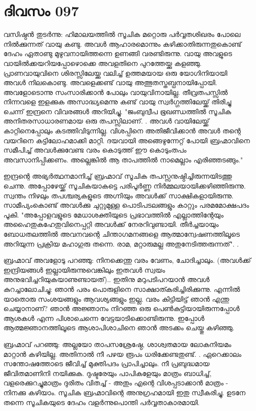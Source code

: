 \newpage
\section{ദിവസം 097}


വസിഷ്ഠന്‍ തുടര്‍ന്നു: ഹിമാലയത്തില്‍ സൂചിക മറ്റൊരു പര്‍വ്വതശിഖരം പോലെ നില്‍ക്കുന്നത്‌ വായു കണ്ടു. അവള്‍ ആഹാരമൊന്നും കഴിക്കാതിരുന്നതുകൊണ്ട്‌ ദേഹം ഏതാണ്ടു മുഴുവനായിത്തന്നെ ഉണങ്ങി വരണ്ടിരുന്നു. വായു അവളുടെ വായില്‍ക്കയറിയപ്പോഴൊക്കെ അവളതിനെ പുറത്തേയ്ക്കു കളഞ്ഞു. പ്രാണവായുവിനെ ശിരസ്സിലേയ്ക്കു വലിച്ച്‌ ഉത്തമയായ ഒരു യോഗിനിയായി അവള്‍ നിലകൊണ്ടു. അവളെക്കണ്ട്‌ വായു അത്ഭുതസ്തബ്ധനായിപ്പോയി. അവളോടൊന്നു സംസാരിക്കാന്‍ പോലും വായുവിനായില്ല. തീവ്രതപസ്സില്‍ നിന്നവളെ ഇളക്കുക അസാദ്ധ്യമെന്നു കണ്ട്‌ വായു സ്വര്‍ഗ്ഗത്തിലേയ്ക്ക്‌ തിരിച്ചു ചെന്ന് ഇന്ദ്രനെ വിവരങ്ങള്‍ അറിയിച്ചു. "ജംബുദ്വീപ ഭൂഖണ്ഡത്തില്‍ സൂചിക അനിതരസാധാരണമായ ഒരു തപസ്സിലാണ്‌. . അവള്‍ വായിലേയ്ക്ക്‌ കാറ്റിനെപ്പോലും കടത്തിവിടുന്നില്ല. വിശപ്പിനെ അതിജീവിക്കാന്‍ അവള്‍ തന്റെ വയറിനെ കട്ടിലോഹമാക്കി മാറ്റി. ദയവായി അങ്ങെഴുന്നേറ്റ്‌ പോയി ബ്രഹ്മാവിനെ സമീപിച്ച്‌ അവള്‍ക്കുവേണ്ട വരം കൊടുത്ത്‌ ഈ കൊടുംതപം അവസാനിപ്പിക്കണം. അല്ലെങ്കില്‍ ആ താപത്തില്‍ നാമെല്ലാം എരിഞ്ഞടങ്ങും." 

ഇന്ദ്രന്റെ അഭ്യര്‍ത്ഥനമാനിച്ച്‌ ബ്രഹ്മാവ്‌ സൂചിക തപസ്സനുഷ്ഠിച്ചിരുന്നയിടത്തു ചെന്നു. അപ്പോഴേയ്ക്ക്‌ സൂചികയാകട്ടെ പരിപൂര്‍ണ്ണ നിര്‍മ്മലയായിക്കഴിഞ്ഞിരുന്നു. സ്വന്തം നിഴലും തപശ്ചര്യകളുടെ അഗ്നിയും അവള്‍ക്ക്‌ സാക്ഷികളായിരുന്നു. സാമീപ്യംകൊണ്ട്‌ അവള്‍ക്കു ചുറ്റുമുള്ള പൊടിപടലങ്ങളും കാറ്റും പരമമോക്ഷപദം പൂകി. "അപ്പോളവളുടെ മേധാശക്തിയുടെ പ്രഭാവത്തില്‍ എല്ലാത്തിന്റേയും അഹൈതുകഹേതുവിനെപ്പറ്റി അവള്‍ക്ക്‌ നേരറിവുണ്ടായി. തീര്‍ച്ചയായും ബോധതലത്തില്‍ അവനവന്റെ ചിന്താഗമനങ്ങളെ ആത്മാന്വേഷണത്തിലൂടെ അറിയുന്ന പ്രക്രിയ മഹാഗുരു തന്നെ. രാമ, മറ്റാരുമല്ല അതുനേടിത്തരുന്നത്‌". .

ബ്രഹ്മാവ്‌ അവളോടു പറഞ്ഞു: നിനക്കെന്തു വരം വേണം, ചോദിച്ചാലും. (അവള്‍ക്ക്‌ ഇന്ദ്രിയങ്ങള്‍ ഇല്ലായിരുന്നുവെങ്കിലും ഇതവള്‍ സ്വയം അനുഭവിച്ചറിയുകയാണുണ്ടായത്‌).. ഇതിനു മറുപടിപറയാന്‍ അവള്‍ കുറച്ചാലോചിച്ചു: ഞാന്‍ പരം പൊരുളിനെ സാക്ഷാത്കരിച്ചിരിക്കുന്നു. എന്നില്‍ യാതൊരു സംശയങ്ങളും ആവശ്യങ്ങളും ഇല്ല. വരം കിട്ടിയിട്ട്‌ ഞാന്‍ എന്തു ചെയ്യാനാണ്‌? ഞാന്‍ അജ്ഞാനം നിറഞ്ഞ ഒരു പെണ്‍കുട്ടിയായിരുന്നപ്പോള്‍ ആശകള്‍ എന്ന പിശാചെന്നെ വേട്ടയാടിക്കൊണ്ടിരുന്നു. ഇപ്പോള്‍ ആത്മജ്ഞാനത്തിലൂടെ ആശാപിശാചിനെ ഞാന്‍ അടക്കം ചെയ്തു കഴിഞ്ഞു. 

ബ്രഹ്മാവ്‌ പറഞ്ഞു: അല്ലയോ താപസശ്രേഷ്ഠേ, ശാശ്വതമായ ലോകനിയമം മാറ്റാന്‍ കഴിയില്ല. അതിനാല്‍ നീ പഴയ രൂപം ധരിക്കേണ്ടതുണ്ട്‌. . ഏറെക്കാലം സന്തോഷത്തോടെ ജീവിച്ച്‌ മുക്തിപദം പ്രാപിച്ചാലും. നീ പ്രബുദ്ധമായ ജീവിതമാണിനി നയിക്കുക. ദുഷ്ടരേയും പാപികളേയും മാത്രം ബാധിച്ച്‌, വളരെക്കുറച്ചുമാത്രം ദുരിതം വിതച്ച്‌ - അതും എന്റെ വിശപ്പടാക്കാന്‍ മാത്രം - നിനക്കു കഴിയാം. സൂചിക ബ്രഹ്മാവിന്റെ അനുഗ്രഹമായി ഇതു സ്വീകരിച്ചു. ഉടനേ തന്നെ സൂചികയുടെ ദേഹം വളര്‍ന്നുപൊന്തി പര്‍വ്വതാകാരമായി. 

